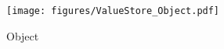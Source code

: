 \begin{figure}[H]
    \centering
    \texttt{[image: figures/ValueStore\_Object.pdf]}
    \caption{\ValueStore{} Object}
\end{figure}

